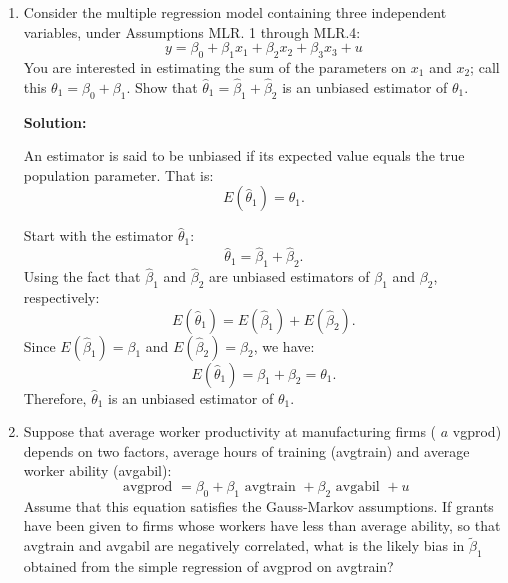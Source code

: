 \documentclass[12pt]{article}
\begin{document}
\begin{enumerate}
{\begin{enumerate}
The calculated standard errors are:
\[
\text{SE}(\hat{\beta}_1) \approx 0.197,
\]
\[
\text{SE}(\hat{\beta}_2) \approx 0.071,
\]
\[
\text{SE}(\hat{\beta}_3) \approx 0.150.
\]


    \item Define and calculate the explained sum of squares for the variable \( \log(\text{rent}) \).

    The explained sum of squares (ESS) is defined as:
    \[
    \text{ESS} = \text{SST} - \text{SSR},
    \]
    where:
    \begin{itemize}
        \item \( \text{SST} = 1845.018 \) is the total sum of squares,
        \item \( \text{SSR} = 1000 \) is the sum of squared residuals.
    \end{itemize}

    The calculated ESS is:
    \[
    \text{ESS} = 1845.018 - 1000 = 845.018.
    \]
\end{enumerate}
}


\item Consider the multiple regression model containing three independent variables, under Assumptions MLR. 1 through MLR.4:
$$
y=\beta_0+\beta_1 x_1+\beta_2 x_2+\beta_3 x_3+u
$$
You are interested in estimating the sum of the parameters on $x_1$ and $x_2$; call this $\theta_1=\beta_0+\beta_1$.  Show that $\hat{\theta}_1=\hat{\beta}_1+\hat{\beta}_2$ is an unbiased estimator of $\theta_1$.

{\color{blue}
\noindent \textbf{Solution:}

An estimator is said to be unbiased if its expected value equals the true population parameter. That is:
\[
E(\hat{\theta}_1) = \theta_1.
\]

Start with the estimator \( \hat{\theta}_1 \):
\[
\hat{\theta}_1 = \hat{\beta}_1 + \hat{\beta}_2.
\]
Using the fact that \( \hat{\beta}_1 \) and \( \hat{\beta}_2 \) are unbiased estimators of \( \beta_1 \) and \( \beta_2 \), respectively:
\[
E(\hat{\theta}_1) = E(\hat{\beta}_1) + E(\hat{\beta}_2).
\]
Since \( E(\hat{\beta}_1) = \beta_1 \) and \( E(\hat{\beta}_2) = \beta_2 \), we have:
\[
E(\hat{\theta}_1) = \beta_1 + \beta_2 = \theta_1.
\]
Therefore, \( \hat{\theta}_1 \) is an unbiased estimator of \( \theta_1 \).

}



\item Suppose that average worker productivity at manufacturing firms ( $a$ vgprod) depends on two factors, average hours of training (avgtrain) and average worker ability (avgabil):
$$
\text { avgprod }=\beta_0+\beta_1 \text { avgtrain }+\beta_2 \text { avgabil }+u
$$
Assume that this equation satisfies the Gauss-Markov assumptions. If grants have been given to firms whose workers have less than average ability, so that avgtrain and avgabil are negatively correlated, what is the likely bias in $\widetilde{\beta}_1$ obtained from the simple regression of avgprod on avgtrain?



\end{enumerate}
\end{document}
